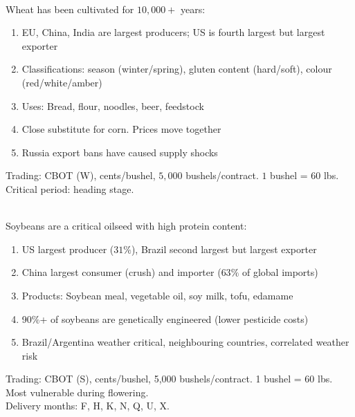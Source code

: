 \documentclass[a4paper,oneside,openany]{book}
\begin{document}
\begin{remark} \\
Wheat has been cultivated for $10,000+$ years:
\begin{enumerate}[label=\roman*.]
\setlength{\itemsep}{0pt}
\item EU, China, India are largest producers; US is fourth largest but largest exporter
\item Classifications: season (winter/spring), gluten content (hard/soft), colour (red/white/amber)
\item Uses: Bread, flour, noodles, beer, feedstock
\item Close substitute for corn. Prices move together
\item Russia export bans have caused supply shocks
\end{enumerate}
Trading: CBOT (W), cents/bushel, $5,000$ bushels/contract. $1$ bushel = $60$ lbs.\\
Critical period: heading stage.
\end{remark}

\begin{remark} \\
Soybeans are a critical oilseed with high protein content:
\begin{enumerate}[label=\roman*.]
\setlength{\itemsep}{0pt}
\item US largest producer ($31\%$), Brazil second largest but largest exporter
\item China largest consumer (crush) and importer ($63\%$ of global imports)
\item Products: Soybean meal, vegetable oil, soy milk, tofu, edamame
\item 90\%+ of soybeans are genetically engineered (lower pesticide costs)
\item Brazil/Argentina weather critical, neighbouring countries, correlated weather risk
\end{enumerate}
Trading: CBOT (S), cents/bushel, 5,000 bushels/contract. 1 bushel = 60 lbs. Most vulnerable during flowering.\\
Delivery months: F, H, K, N, Q, U, X.
\end{remark}
\end{document}

